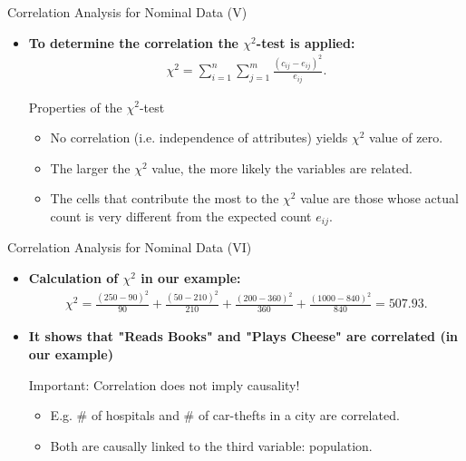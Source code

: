 \begin{frame}{Correlation Analysis for Nominal Data (V)}
	\begin{itemize}
		\item \textbf{To determine the correlation the
				      {\color{airforceblue}$\chi^2$-test} is applied:}
		      \begin{align*}
			      \chi^2 = \sum_{i=1}^{n}\sum_{j=1}^{m}
			      \frac{(c_{ij}-e_{ij})^2}{e_{ij}}.
		      \end{align*}
		      \begin{block}{Properties of the $\chi^2$-test}
			      \begin{itemize}
				      \item No correlation (i.e. independence of attributes) yields
				            $\chi^2$
				            value of zero.
				      \item The larger the $\chi^2$ value, the more likely the
				            variables are
				            related.
				      \item The cells that contribute the most to the $\chi^2$ value
				            are those whose actual count is very different from the
				            expected count
				            $e_{ij}$.
			      \end{itemize}
		      \end{block}
	\end{itemize}
\end{frame}

\begin{frame}{Correlation Analysis for Nominal Data (VI)}
	\begin{itemize}
		\item \textbf{Calculation of $\chi^2$ in our example:}
		      \begin{align*}
			      \chi^2 = \frac{(250-90)^2}{90} + \frac{(50-210)^2}{210} +
			      \frac{(200-360)^2}{360} + \frac{(1000-840)^2}{840} = 507.93.
		      \end{align*}
		\item \textbf{It shows that "Reads Books" and "Plays Cheese" are
			      correlated (in our example)}
		      \vspace{5mm}
		      \begin{alertblock}{Important: Correlation does not imply causality!}
			      \begin{itemize}
				      \item E.g. $\#$ of hospitals and $\#$ of car-thefts in a city
				            are correlated.
				      \item Both are causally linked to the third variable:
				            population.
			      \end{itemize}
		      \end{alertblock}
	\end{itemize}
\end{frame}

